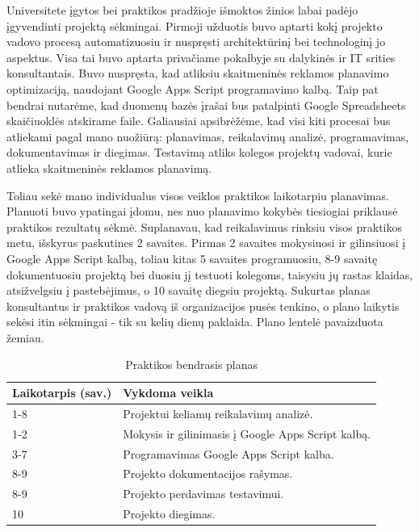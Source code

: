 \documentclass{VUMIFPSkursinis}
\begin{document}
Universitete įgytos bei praktikos pradžioje išmoktos žinios labai padėjo įgyvendinti projektą sėkmingai. Pirmoji užduotis buvo aptarti kokį projekto vadovo procesą automatizuosiu ir nuspręsti architektūrinį bei technologinį jo aspektus. Visa tai buvo aptarta privačiame pokalbyje su dalykinės ir IT srities konsultantais. Buvo nuspręsta, kad atliksiu skaitmeninės reklamos planavimo optimizaciją, naudojant Google Apps Script programavimo kalbą. Taip pat bendrai nutarėme, kad duomenų bazės įrašai bus patalpinti Google Spreadsheets skaičiuoklės atskirame faile. Galiausiai apsibrėžėme, kad visi kiti procesai bus atliekami pagal mano nuožiūrą: planavimas, reikalavimų analizė, programavimas, dokumentavimas ir diegimas. Testavimą atliks kolegos projektų vadovai, kurie atlieka skaitmeninės reklamos planavimą.

Toliau sekė mano individualus visos veiklos praktikos laikotarpiu planavimas. Planuoti buvo ypatingai įdomu, nes nuo planavimo kokybės tiesiogiai priklausė praktikos rezultatų sėkmė. Suplanavau, kad reikalavimus rinksiu visos praktikos metu, išskyrus paskutines 2 savaites. Pirmas 2 savaites mokysiuosi ir gilinsiuosi į Google Apps Script kalbą, toliau kitas 5 savaites programuosiu, 8-9 savaitę dokumentuosiu projektą bei duosiu jį testuoti kolegoms, taisysiu jų rastas klaidas, atsižvelgsiu į pastebėjimus, o 10 savaitę diegsiu projektą. Sukurtas planas konsultantus ir praktikos vadovą iš organizacijos pusės tenkino, o plano laikytis sekėsi itin sėkmingai - tik su kelių dienų paklaida. Plano lentelė pavaizduota žemiau.

\begin{table}[htb]
\centering
\caption{Praktikos bendrasis planas}
\begin{tabular}{|L{3.5cm}|L{12cm}|}
\hline

Laikotarpis (sav.) & 
Vykdoma veikla     
\\ \hline

1-8 & 
Projektui keliamų reikalavimų analizė.
\\ \hline

1-2 & 
Mokysis ir gilinimasis į Google Apps Script kalbą.  
\\ \hline

3-7 & 
Programavimas Google Apps Script kalba.
\\ \hline

8-9 & 
Projekto dokumentacijos rašymas.
\\ \hline

8-9 & 
Projekto perdavimas testavimui.
\\ \hline

10 & 
Projekto diegimas.  
\\ \hline

\end{tabular}
\end{table}
\end{document}
